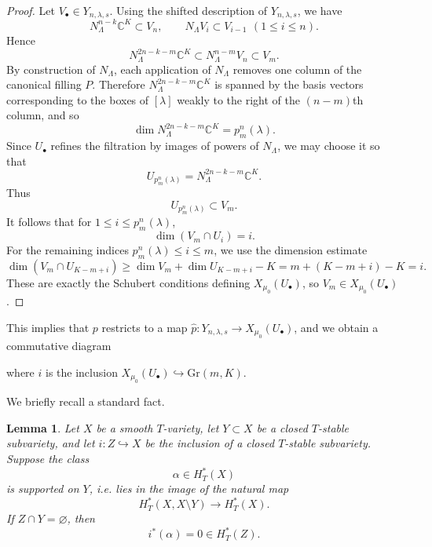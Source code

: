\documentclass[11pt]{amsart}
\numberwithin{equation}{section}
\newtheorem{lemma}[theorem]{Lemma}
\theoremstyle{definition}
\newcommand{\Gr}{{\mathrm {Gr}}}
\newcommand{\CC}{{\mathbb{C}}}
\newcommand{\Fl}{\text{Fl}}
\begin{document}
\begin{proof}
    Let $V_\bullet\in Y_{n,\lambda,s}$. Using the shifted description of
    $Y_{n,\lambda,s}$, we have
    \[
    N_\Lambda^{n-k}\CC^K\subset V_n,
    \qquad
    N_\Lambda V_i\subset V_{i-1}\ \, (1\leq i\leq n).
    \]
    Hence
    \[
    N_\Lambda^{2n-k-m}\CC^K
    \subset N_\Lambda^{n-m}V_n
    \subset V_m.
    \]
    By construction of $N_\Lambda$, each application of $N_\Lambda$ removes one
    column of the canonical filling $P$. Therefore
    $N_\Lambda^{2n-k-m}\CC^K$ is spanned by the basis vectors corresponding to
    the boxes of $[\lambda]$ weakly to the right of the $(n-m)$th column, and so
    \[
    \dim N_\Lambda^{2n-k-m}\CC^K=p_m^n(\lambda).
    \]
    Since $U_\bullet$ refines the filtration by images of powers of $N_\Lambda$,
    we may choose it so that
    \[
    U_{p_m^n(\lambda)}=N_\Lambda^{2n-k-m}\CC^K.
    \]
    Thus
    \[
    U_{p_m^n(\lambda)}\subset V_m.
    \]
    It follows that for $1\leq i\leq p_m^n(\lambda)$,
    \[
    \dim(V_m\cap U_i)=i.
    \]
    For the remaining indices $p_m^n(\lambda)\leq i\leq m$, we use the dimension
    estimate
    \[
    \dim(V_m\cap U_{K-m+i})
    \geq \dim V_m + \dim U_{K-m+i} - K
    = m + (K-m+i)-K = i.
    \]
    These are exactly the Schubert conditions defining
    $X_{\mu_0}(U_\bullet)$, so $V_m\in X_{\mu_0}(U_\bullet)$.
\end{proof}
This implies that $p$ restricts to a map
$\widehat{p}:Y_{n,\lambda,s}\to X_{\mu_0}(U_\bullet)$, and we obtain a
commutative diagram
\begin{center}
\end{center}
where $i$ is the inclusion $X_{\mu_0}(U_\bullet)\hookrightarrow \Gr(m,K)$.

We briefly recall a standard fact.

\begin{lemma}\label{lem:eq-class-supported-vanishes}
    Let $X$ be a smooth $T$-variety, let $Y \subset X$ be a closed
    $T$-stable subvariety, and let $i:Z\hookrightarrow X$ be the inclusion
    of a closed $T$-stable subvariety. Suppose the class
    \[
        \alpha \in H_T^*(X)
    \]
    is supported on $Y$, i.e. lies in the image of the natural map
    \[
        H_T^*(X,X\setminus Y)\to H_T^*(X).
    \]
    If $Z\cap Y=\varnothing$, then
    \[
        i^*(\alpha)=0 \in H_T^*(Z).
    \]
\end{lemma}
\end{document}
